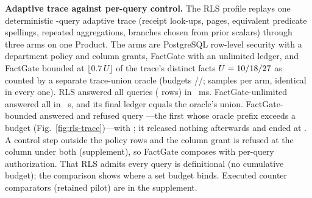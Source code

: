 \documentclass[10pt,journal,compsoc]{IEEEtran}
\newcommand{\system}{FactGate\xspace}
\begin{document}
\textbf{Adaptive trace against per-query control.} The RLS profile replays
one deterministic \FinalVFivePublicationRLSQueries{}-query adaptive trace
(receipt look-ups, pages, equivalent predicate spellings, repeated
aggregations, branches chosen from prior scalars) through three arms on one
Product. The arms are PostgreSQL row-level security with a department policy and column
grants, \system with an unlimited ledger, and \system bounded at
$\lfloor 0.7\,U\rfloor$ of the trace's distinct facts
$U=10{}/18{}/27{}$
as counted by a separate trace-union oracle (budgets
\FinalVFivePublicationRLSBudgetRelease{}/\FinalVFivePublicationRLSBudgetDependency{}/\FinalVFivePublicationRLSBudgetOutcome{};
\FinalVFivePublicationRLSPerCell{} samples per arm, identical in every one).
RLS answered all \FinalVFivePublicationRLSQueries{} queries
(\FinalVFivePublicationRLSRowsRLS{} rows) in
\FinalVFivePublicationRLSDrainRLSMS{}~ms. \system-unlimited answered all in
\FinalVFivePublicationRLSDrainUnlimitedS{}~s, and its final ledger equals the
oracle's union. \system-bounded answered
\FinalVFivePublicationRLSBoundedSuccessful{} and
refused query \FinalVFivePublicationRLSBoundedRefusalIndex{}---the first
whose oracle prefix exceeds a budget (Fig.~\ref{fig:rls-trace})---with
\FinalVFivePublicationAttackThresholdRejectionCode{}; it released nothing
afterwards and ended at \FinalVFivePublicationRLSBoundedLedger{}. A control
step outside the policy rows and the column grant is refused at the column
under both (supplement), so \system composes with per-query authorization.
That RLS admits every query is definitional (no cumulative budget); the
comparison shows where a set budget binds. Executed counter comparators (retained pilot) are in the supplement.
\end{document}
